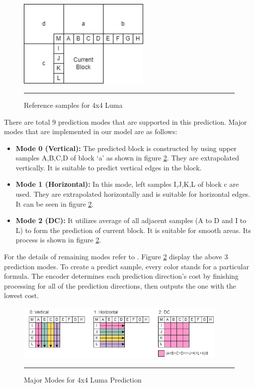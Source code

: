 \begin{figure}[H]
	\centering
	\includegraphics[width = 2.5in]{./Figures/4x4luma.png}
	\rule{35em}{0.5pt}
	\caption{Reference samples for 4x4 Luma}
	\label{fig:4x4xluma}
\end{figure}

There are total 9 prediction modes that are supported in this prediction. Major modes that are implemented in our model are as follows:

\begin{itemize}
	\item \textbf{Mode 0 (Vertical):} The predicted block is constructed by using upper samples A,B,C,D of block ‘a’ as shown in figure \ref{fig:3modes}. They are extrapolated vertically. It is suitable to predict vertical edges in the block.
	\item \textbf{Mode 1 (Horizontal):} In this mode, left samples I,J,K,L of block c are used. They are extrapolated horizontally and is suitable for horizontal edges. It can be seen in figure \ref{fig:3modes}.
	\item \textbf{Mode 2 (DC):} It utilizes average of all adjacent samples (A to D and I to L) to form the prediction of current block. It is suitable for smooth areas. Its process is shown in figure \ref{fig:3modes}.

\end{itemize}
	 
For the details of remaining modes refer to \cite{richardson2010h264}. Figure \ref{fig:3modes} display the above 3 prediction modes. To create a predict sample, every color stands for a particular formula. The encoder determines each prediction direction's cost by finishing processing for all of the prediction directions, then outputs the one with the lowest cost.

\begin{figure}[H]
	\centering
	\includegraphics[width = 4in]{./Figures/3modes.png}
	\rule{35em}{0.5pt}
	\caption{Major Modes for 4x4 Luma Prediction}
	\label{fig:3modes}
\end{figure}

